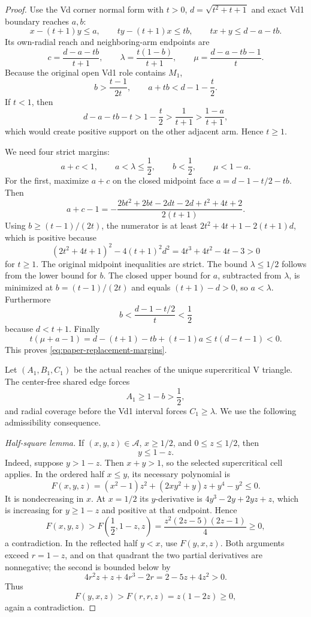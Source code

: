 \begin{proof}
Use the Vd corner normal form with $t>0$, $d=\sqrt{t^2+t+1}$ and exact Vd1
boundary reaches $a,b$:
\[
 x-(t+1)y\le a,
 \qquad
 ty-(t+1)x\le tb,
 \qquad
 tx+y\le d-a-tb.
\]
Its own-radial reach and neighboring-arm endpoints are
\[
 c=\frac{d-a-tb}{t+1},
 \qquad
 \lambda=\frac{t(1-b)}{t+1},
 \qquad
 \mu=\frac{d-a-tb-1}{t}.
\]
Because the original open Vd1 role contains $M_1$,
\[
 b>\frac{t-1}{2t},
 \qquad
 a+tb<d-1-\frac t2.
\]
If $t<1$, then
\[
 d-a-tb-t>1-\frac t2>\frac1{t+1}>\frac{1-a}{t+1},
\]
which would create positive support on the other adjacent arm.  Hence
$t\ge1$.

We need four strict margins:
\begin{equation}
 a+c<1,
 \qquad
 a<\lambda\le\frac12,
 \qquad
 b<\frac12,
 \qquad
 \mu<1-a.
 \label{eq:paper-replacement-margins}
\end{equation}
For the first, maximize $a+c$ on the closed midpoint face
$a=d-1-t/2-tb$.  Then
\[
 a+c-1=-\frac{2bt^2+2bt-2dt-2d+t^2+4t+2}{2(t+1)}.
\]
Using $b\ge(t-1)/(2t)$, the numerator is at least
$2t^2+4t+1-2(t+1)d$, which is positive because
\[
 (2t^2+4t+1)^2-4(t+1)^2d^2
 =4t^3+4t^2-4t-3>0
\]
for $t\ge1$.  The original midpoint inequalities are strict.
The bound $\lambda\le1/2$ follows from the lower bound for $b$.  The closed
upper bound for $a$, subtracted from $\lambda$, is minimized at
$b=(t-1)/(2t)$ and equals $(t+1)-d>0$, so $a<\lambda$.
Furthermore
\[
 b<\frac{d-1-t/2}{t}<\frac12
\]
because $d<t+1$.  Finally
\[
 t(\mu+a-1)=d-(t+1)-tb+(t-1)a
 \le t(d-t-1)<0.
\]
This proves \eqref{eq:paper-replacement-margins}.

Let $(A_1,B_1,C_1)$ be the actual reaches of the unique supercritical V triangle.
The center-free shared edge forces
\[
 A_1\ge1-b>\frac12,
\]
and radial coverage before the Vd1 interval forces $C_1\ge\lambda$.  We use the
following admissibility consequence.

\emph{Half-square lemma.}
If $(x,y,z)\in\mathcal A$, $x\ge1/2$, and $0\le z\le1/2$, then
\[
 y\le1-z.
\]
Indeed, suppose $y>1-z$.  Then $x+y>1$, so the selected supercritical cell
applies.  In the ordered half $x\le y$, its necessary polynomial is
\[
 F(x,y,z)=(x^2-1)z^2+(2xy^2+y)z+y^4-y^2\le0.
\]
It is nondecreasing in $x$.  At $x=1/2$ its $y$-derivative is
$4y^3-2y+2yz+z$, which is increasing for $y\ge1-z$ and positive at that
endpoint.  Hence
\[
 F(x,y,z)>F\left(\frac12,1-z,z\right)
 =\frac{z^2(2z-5)(2z-1)}4\ge0,
\]
a contradiction.  In the reflected half $y<x$, use $F(y,x,z)$.  Both
arguments exceed $r=1-z$, and on that quadrant the two partial derivatives are
nonnegative; the second is bounded below by
\[
 4r^2z+z+4r^3-2r=2-5z+4z^2>0.
\]
Thus
\[
 F(y,x,z)>F(r,r,z)=z(1-2z)\ge0,
\]
again a contradiction.


\end{proof}
